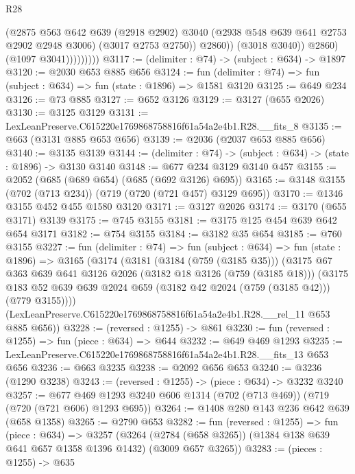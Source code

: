 \begin{lexlean}{R28}
\begin{coremodule}
                            (@2875
                              @563
                              @642
                              @639
                              (@2918 @2902)
                              @3040
                              (@2938 @548 @639 @641 @2753 @2902 @2948 @3006)
                              (@3017 @2753 @2750))
                            @2860))
                        (@3018 @3040))
                      @2860)
                    (@1097 @3041)))))))))
@3117 := (delimiter : @74) -> (subject : @634) -> @1897
@3120 := @2030 @653 @885 @656
@3124 := fun (delimiter : @74) => fun (subject : @634) => fun (state : @1896) => @1581 @3120
@3125 := @649 @234
@3126 := @73 @885
@3127 := @652 @3126
@3129 := @3127 (@655 @2026)
@3130 := @3125 @3129
@3131 := LexLeanPreserve.C615220e1769868758816f61a54a2e4b1.R28.__fits_8
@3135 := @663 (@3131 @885 @653 @656)
@3139 := @2036 (@2037 @653 @885 @656)
@3140 := @3135 @3139
@3144 := (delimiter : @74) -> (subject : @634) -> (state : @1896) -> @3130 @3140
@3148 := @677 @234 @3129 @3140 @457
@3155 := @2052 (@685 (@689 @654) (@685 (@692 @3126) @695))
@3165 := @3148 @3155 (@702 (@713 @234)) (@719 (@720 (@721 @457) @3129 @695))
@3170 := @1346 @3155 @452 @455 @1580 @3120
@3171 := @3127 @2026
@3174 := @3170 (@655 @3171) @3139
@3175 := @745 @3155
@3181 := @3175 @125 @454 @639 @642 @654 @3171
@3182 := @754 @3155
@3184 := @3182 @35 @654
@3185 := @760 @3155
@3227 := fun (delimiter : @74) =>
  fun (subject : @634) =>
  fun (state : @1896) =>
  @3165
    (@3174
      (@3181
        (@3184 (@759 (@3185 @35)))
        (@3175
          @67
          @363
          @639
          @641
          @3126
          @2026
          (@3182 @18 @3126 (@759 (@3185 @18)))
          (@3175 @183 @52 @639 @639 @2024 @659 (@3182 @42 @2024 (@759 (@3185 @42))) (@779 @3155))))
      (LexLeanPreserve.C615220e1769868758816f61a54a2e4b1.R28.__rel_11 @653 @885 @656))
@3228 := (reversed : @1255) -> @861
@3230 := fun (reversed : @1255) => fun (piece : @634) => @644
@3232 := @649 @469 @1293
@3235 := LexLeanPreserve.C615220e1769868758816f61a54a2e4b1.R28.__fits_13 @653 @656
@3236 := @663 @3235
@3238 := @2092 @656 @653
@3240 := @3236 (@1290 @3238)
@3243 := (reversed : @1255) -> (piece : @634) -> @3232 @3240
@3257 := @677 @469 @1293 @3240 @606 @1314 (@702 (@713 @469)) (@719 (@720 (@721 @606) @1293 @695))
@3264 := @1408 @280 @143 @236 @642 @639 (@658 @1358)
@3265 := @2790 @653
@3282 := fun (reversed : @1255) =>
  fun (piece : @634) =>
  @3257
    (@3264 (@2784 (@658 @3265)) (@1384 @138 @639 @641 @657 @1358 @1396 @1432) (@3009 @657 @3265))
@3283 := (pieces : @1255) -> @635

\end{coremodule}
\end{lexlean}
